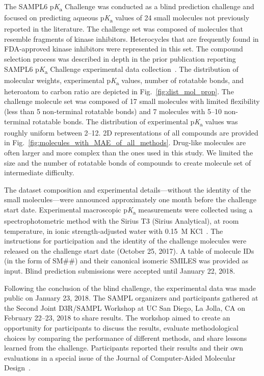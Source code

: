 \documentclass[9pt,lineno,final]{elife}
\newcommand{\pKa}{p\textit{K}\textsubscript{a}}
\begin{document}
The SAMPL6 \pKa{} Challenge was conducted as a blind prediction challenge and focused on predicting aqueous \pKa{} values of 24 small molecules not previously reported in the literature. 
The challenge set was composed of molecules that resemble fragments of kinase inhibitors. 
Heterocycles that are frequently found in FDA-approved kinase inhibitors were represented in this set. 
The compound selection process was described in depth in the prior publication reporting SAMPL6 \pKa{} Challenge experimental data collection~\citep{Isik:2018:J.Comput.AidedMol.Des.}.
The distribution of molecular weights, experimental \pKa{} values, number of rotatable bonds, and heteroatom to carbon ratio are depicted in Fig.~\ref{fig:dist_mol_prop}. 
The challenge molecule set was composed of 17 small molecules with limited flexibility (less than 5 non-terminal rotatable bonds) and 7 molecules with 5--10 non-terminal rotatable bonds. 
The distribution of experimental \pKa{} values was roughly uniform between 2--12.
2D representations of all compounds are provided in Fig.~\ref{fig:molecules_with_MAE_of_all_methods}. 
Drug-like molecules are often larger and more complex than the ones used in this study. 
We limited the size and the number of rotatable bonds of compounds to create molecule set of intermediate difficulty.

The dataset composition and experimental details---without the identity of the small molecules---were announced approximately one month before the challenge start date. 
Experimental macroscopic \pKa{} measurements were collected using a spectrophotometric method with the Sirius T3 (Sirius Analytical), at room temperature, in ionic strength-adjusted water with 0.15~M KCl~\citep{Isik:2018:J.Comput.AidedMol.Des.}. 
The instructions for participation and the identity of the challenge molecules were released on the challenge start date (October 25, 2017). 
A table of molecule IDs (in the form of SM\#\#) and	their canonical isomeric SMILES was provided as input.
Blind prediction submissions were accepted until January 22, 2018. 

Following the conclusion of the blind challenge, the experimental data was made public on January 23, 2018. 
The SAMPL organizers and participants gathered at the Second Joint D3R/SAMPL Workshop at UC San Diego, La Jolla, CA on February 22--23, 2018 to share results.
The workshop aimed to create an opportunity for participants to discuss the results, evaluate methodological choices by comparing the performance of different methods, and share lessons learned from  the challenge. 
Participants reported their results and their own evaluations in a special issue of the Journal of Computer-Aided Molecular Design~\citep{JCAMD_special_issue_pKa}. 
\end{document}
